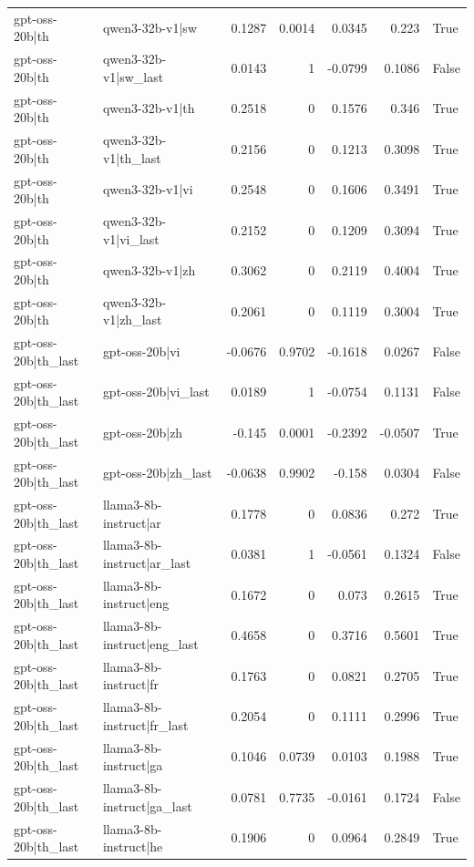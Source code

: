 \begin{table}
\begin{tabular}{l l r r r r l}
gpt-oss-20b|th & qwen3-32b-v1|sw & 0.1287 & 0.0014 & 0.0345 & 0.223 & True \\
gpt-oss-20b|th & qwen3-32b-v1|sw_last & 0.0143 & 1 & -0.0799 & 0.1086 & False \\
gpt-oss-20b|th & qwen3-32b-v1|th & 0.2518 & 0 & 0.1576 & 0.346 & True \\
gpt-oss-20b|th & qwen3-32b-v1|th_last & 0.2156 & 0 & 0.1213 & 0.3098 & True \\
gpt-oss-20b|th & qwen3-32b-v1|vi & 0.2548 & 0 & 0.1606 & 0.3491 & True \\
gpt-oss-20b|th & qwen3-32b-v1|vi_last & 0.2152 & 0 & 0.1209 & 0.3094 & True \\
gpt-oss-20b|th & qwen3-32b-v1|zh & 0.3062 & 0 & 0.2119 & 0.4004 & True \\
gpt-oss-20b|th & qwen3-32b-v1|zh_last & 0.2061 & 0 & 0.1119 & 0.3004 & True \\
gpt-oss-20b|th_last & gpt-oss-20b|vi & -0.0676 & 0.9702 & -0.1618 & 0.0267 & False \\
gpt-oss-20b|th_last & gpt-oss-20b|vi_last & 0.0189 & 1 & -0.0754 & 0.1131 & False \\
gpt-oss-20b|th_last & gpt-oss-20b|zh & -0.145 & 0.0001 & -0.2392 & -0.0507 & True \\
gpt-oss-20b|th_last & gpt-oss-20b|zh_last & -0.0638 & 0.9902 & -0.158 & 0.0304 & False \\
gpt-oss-20b|th_last & llama3-8b-instruct|ar & 0.1778 & 0 & 0.0836 & 0.272 & True \\
gpt-oss-20b|th_last & llama3-8b-instruct|ar_last & 0.0381 & 1 & -0.0561 & 0.1324 & False \\
gpt-oss-20b|th_last & llama3-8b-instruct|eng & 0.1672 & 0 & 0.073 & 0.2615 & True \\
gpt-oss-20b|th_last & llama3-8b-instruct|eng_last & 0.4658 & 0 & 0.3716 & 0.5601 & True \\
gpt-oss-20b|th_last & llama3-8b-instruct|fr & 0.1763 & 0 & 0.0821 & 0.2705 & True \\
gpt-oss-20b|th_last & llama3-8b-instruct|fr_last & 0.2054 & 0 & 0.1111 & 0.2996 & True \\
gpt-oss-20b|th_last & llama3-8b-instruct|ga & 0.1046 & 0.0739 & 0.0103 & 0.1988 & True \\
gpt-oss-20b|th_last & llama3-8b-instruct|ga_last & 0.0781 & 0.7735 & -0.0161 & 0.1724 & False \\
gpt-oss-20b|th_last & llama3-8b-instruct|he & 0.1906 & 0 & 0.0964 & 0.2849 & True \\

\end{tabular}
\end{table}
